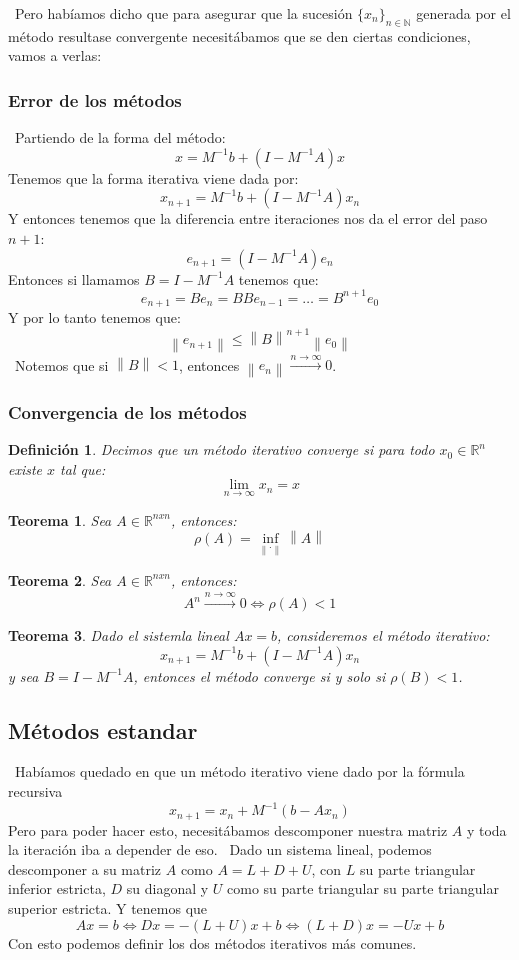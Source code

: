 \documentclass[12pt, oneside]{book}
\newtheorem*{definition}{Definición}
\newtheorem*{theorem}{Teorema}
\newcommand{\norm}[1]{\left\lVert#1\right\rVert}
\begin{document}
\ Pero habíamos dicho que para asegurar que la sucesión $\{x_n\}_{n \in \mathbb{N}}$ generada por el método resultase convergente necesitábamos que se den ciertas condiciones, vamos a verlas:

\subsubsection{Error de los métodos}
\ Partiendo de la forma del método: $$x=M^{-1}b+(I-M^{-1}A)x$$ Tenemos que la forma iterativa viene dada por: $$x_{n+1}=M^{-1}b+(I-M^{-1}A)x_n$$ Y entonces tenemos que la diferencia entre iteraciones nos da el error del paso $n+1$: $$e_{n+1}=(I-M^{-1}A)e_n$$ Entonces si llamamos $B=I-M^{-1}A$ tenemos que: $$e_{n+1}=Be_n=BBe_{n-1}=\dots=B^{n+1}e_0$$ Y por lo tanto tenemos que: $$\norm{e_{n+1}} \leq \norm{B}^{n+1}\norm{e_0}$$
\ Notemos que si $\norm{B}<1$, entonces $\norm{e_n}\xrightarrow{n \xrightarrow{} \infty}0$.

\subsubsection{Convergencia de los métodos}
\begin{definition}
	Decimos que un método iterativo converge si para todo $x_0 \in \mathbb{R}^n$ existe $x$ tal que: $$\lim_{n \to \infty}x_n=x$$
\end{definition}

\begin{theorem}
	Sea $A \in \mathbb{R}^{nxn}$, entonces: $$\rho(A)=\inf_{\norm{\cdot}}\norm{A}$$
\end{theorem}

\begin{theorem}
	Sea $A \in \mathbb{R}^{nxn}$, entonces: $$A^n \xrightarrow{n \xrightarrow{} \infty}0 \iff \rho(A)<1$$ 
\end{theorem}

\begin{theorem}
	Dado el sistemla lineal $Ax=b$, consideremos el método iterativo: $$x_{n+1}=M^{-1}b+(I-M^{-1}A)x_n$$ y sea $B=I-M^{-1}A$, entonces el método converge si y solo si $\rho(B)<1$.
\end{theorem}

\subsection{Métodos estandar}
\ Habíamos quedado en que un método iterativo viene dado por la fórmula recursiva $$x_{n+1}=x_n+M^{-1}(b-Ax_n)$$ Pero para poder hacer esto, necesitábamos descomponer nuestra matriz $A$ y toda la iteración iba a depender de eso.
\ Dado un sistema lineal, podemos descomponer a su matriz $A$ como $A=L+D+U$, con $L$ su parte triangular inferior estricta, $D$ su diagonal y $U$ como su parte triangular su parte triangular superior estricta. Y tenemos que $$Ax=b \iff Dx=-(L+U)x+b \iff (L+D)x=-Ux+b$$ Con esto podemos definir los dos métodos iterativos más comunes.
\end{document}
